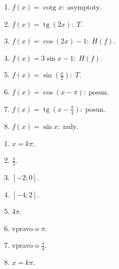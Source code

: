 \documentclass[11pt,a4paper]{article}
\begin{document}
\begin{zadaniReseniBox}[title={Domácí úkol}]
\begin{enumerate}[label=\alph*)]
\item $f(x)=\operatorname{cotg}x:\;\text{asymptoty}$.
\item $f(x)=\operatorname{tg}(2x):\;T$.
\item $f(x)=\cos(2x)-1:\;H(f)$.
\item $f(x)=3\sin x-1:\;H(f)$.
\item $f(x)=\sin(\frac x2):\;T$.
\item $f(x)=\cos(x-\pi):\;\text{posun}$.
\item $f(x)=\operatorname{tg}(x-\frac{\pi}{4}):\;\text{posun}$.
\item $f(x)=\sin x:\;\text{nuly}$.
\end{enumerate}
\tcblower
\begin{enumerate}[label=\alph*)]
\item $x=k\pi$.
\item $\frac{\pi}{2}$.
\item $[-2;0]$.
\item $[-4;2]$.
\item $4\pi$.
\item vpravo o $\pi$.
\item vpravo o $\frac{\pi}{4}$.
\item $x=k\pi$.
\end{enumerate}
\end{zadaniReseniBox}
\end{document}
